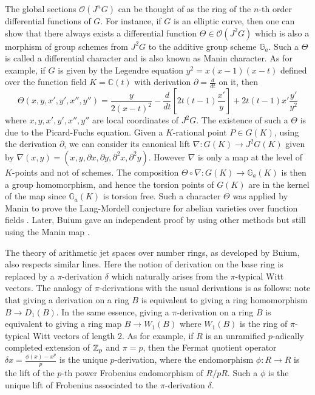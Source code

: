 \documentclass{amsart}
\newcommand {\enm} {\ensuremath}
\def \d{\delta}
\numberwithin {equation}{section}
\newcommand{\Ou}{\enm{\mathcal{O}}}
\newcommand{\map}{\rightarrow}
\newcommand{\bb}[1]{\mathbb{#1}}
\def \d{\delta} \def \bZ{{\mathbb Z}} \def \bV{{\mathcal V}} \def \bF{{\bf F}}
\begin{document}
The global sections $\Ou(J^nG)$ can be thought of as the ring of the $n$-th
order differential functions of $G$. For instance, if 
$G$ is an elliptic curve,
then one can show that there always exists a differential function $\Theta 
\in \Ou(J^2G)$ which is also a morphism of group schemes from $J^2G$ to the
additive group scheme $\bb{G}_a$. Such a $\Theta$ is called a differential
character and is also known as Manin character. As for example, if $G$ is given 
by the Legendre equation $y^2=x(x-1)(x-t)$ defined over the function field $K=
\bb{C}(t)$ with derivation $\partial = \frac{d}{dt}$ on it, then 
$$ 
        \Theta(x,y,x',y',x'',y'')= \frac{y}{2(x-t)^2} - \frac{d}{dt}
        \left[2t(t-1)\frac{x'}{y} \right] + 2t(t-1)x'\frac{y'}{y^2}
$$
where $x,y,x',y',x'',y''$ are local coordinates of $J^2G$. The existence of 
such a $\Theta$ is due to the Picard-Fuchs equation. Given a $K$-rational
point $P \in G(K)$, using the derivation $\partial$, we can consider its
canonical lift $\nabla :G(K) \map J^2G(K)$ given by $\nabla(x,y) =
(x,y,\partial x, \partial y, \partial^2 x, \partial^2 y)$. However 
$\nabla$ is only a map at the level of $K$-points and not of schemes.
The composition $\Theta \circ \nabla: G(K) \map \bb{G}_a(K)$ is then 
a group homomorphism, and hence the torsion points of $G(K)$ are in the 
kernel of the map since $\bb{G}_a(K)$ is torsion free. Such a character $\Theta$
was applied by Manin to prove the Lang-Mordell conjecture for abelian varieties 
over function fields \cite{Manin63}. Later, Buium gave an independent proof 
by using other methods but still using the Manin map \cite{bui92}. 


The theory of arithmetic jet spaces over number rings, as 
developed by Buium, also respects similar
lines. Here the notion of derivation on the base ring is replaced by a 
$\pi$-derivation $\d$ which naturally arises from the $\pi$-typical Witt 
vectors. The analogy of $\pi$-derivations with the usual derivations is as 
follows:
note that giving a derivation on a ring $B$ is equivalent to giving a ring 
homomorphism $B \map {D}_1(B)$. In the same essence, giving a $\pi$-derivation
on a ring $B$ is equivalent to giving a ring map $B \map W_1(B)$ where $W_1(B)$
is the ring of $\pi$-typical Witt vectors of length 2. As for example,
if $R$ is an unramified $p$-adically completed 
extension of ${\mathbb Z}_p$ and 
$\pi=p$, then the Fermat quotient operator $\d x = \frac{\phi(x)- x^p}{p}$ 
is the unique $p$-derivation, where the endomorphism $\phi:R \map R$ is the 
lift of the $p$-th power Frobenius endomorphism of $R/pR$. Such a $\phi$ is the
unique lift of Frobenius associated to the $\pi$-derivation $\d$.
\end{document}
